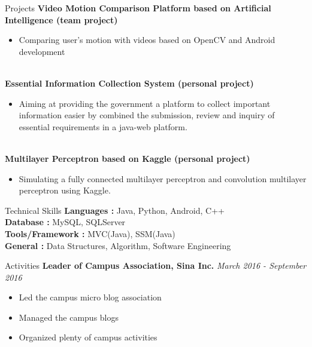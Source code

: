 \documentclass{resume} %
\begin{document}
\begin{rSection}{Projects}
{\bf Video Motion Comparison Platform based on Artificial Intelligence (team project)}
\begin{itemize}
    \item Comparing user's motion with videos based on OpenCV and Android development
\end{itemize}
\\{\bf Essential Information Collection System (personal project)}
\begin{itemize}
    \item Aiming at providing the government a platform to collect important information easier by combined the submission, review and inquiry of essential requirements in a java-web platform.
\end{itemize}

\\{\bf Multilayer Perceptron based on Kaggle (personal project)}
\begin{itemize}
    \item Simulating a fully connected multilayer perceptron and convolution multilayer perceptron using Kaggle.
\end{itemize}
\end{rSection}

\begin{rSection}{Technical Skills}
\textbf{Languages : } Java, Python, Android, C++\\
\textbf{Database : } MySQL, SQLServer\\
\textbf{Tools/Framework : } MVC(Java), SSM(Java)\\
\textbf{General : } Data Structures, Algorithm, Software Engineering
\end{rSection}

\begin{rSection}{Activities} \itemsep -3pt
{\bf Leader of Campus Association, Sina Inc.} \hfill {\em March 2016 - September 2016}
\begin{itemize}
    \item Led the campus micro blog association
    \item Managed the campus blogs
    \item Organized plenty of campus activities
\end{itemize}
\end{rSection}
\end{document}
